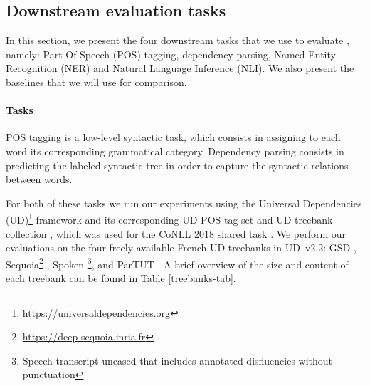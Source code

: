 \subsection{Downstream evaluation tasks}

In this section, we present the four downstream tasks that we use to evaluate \camembert, namely: Part-Of-Speech (POS) tagging, dependency parsing, Named Entity Recognition (NER) and Natural Language Inference (NLI). We also present the baselines that we will use for comparison.


\paragraph{Tasks} POS tagging is a low-level syntactic task, which consists in assigning to each word its corresponding grammatical category. Dependency parsing consists in predicting the labeled syntactic tree in order to capture the syntactic relations between words.

For both of these tasks we run our experiments using the Universal Dependencies (UD)\footnote{\url{https://universaldependencies.org}} framework and its corresponding UD POS tag set \citep{petrov-etal-2012-universal} and UD treebank collection \citep{nivre-etal-2018-universal}, which was used for the CoNLL 2018 shared task \citep{seker-etal-2018-universal}. We perform our evaluations on the four freely available French UD treebanks in UD~v2.2: GSD \citep{mcdonald-etal-2013-universal}, Sequoia\footnote{\url{https://deep-sequoia.inria.fr}} \citep{candito-seddah-2012-le,candito-etal-2014-deep}, Spoken \citep{lacheret-etal-2014-rhapsodie,bawden-etal-2014-correcting}\footnote{Speech transcript uncased that includes annotated disfluencies without punctuation}, and ParTUT \cite{sanguinetti-Bosco-2015-parttut}. A brief overview of the size and content of each treebank can be found in Table \ref{treebanks-tab}.

